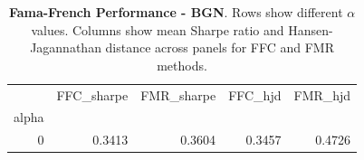 \begin{table}[h]
\centering
\begin{tabular}{rrrrr}
\toprule
 & FFC_sharpe & FMR_sharpe & FFC_hjd & FMR_hjd \\
alpha &  &  &  &  \\
\midrule
0 & 0.3413 & 0.3604 & 0.3457 & 0.4726 \\
\bottomrule
\end{tabular}
\caption{\textbf{Fama-French Performance - BGN}.
    Rows show different $\alpha$ values. Columns show mean Sharpe ratio and
    Hansen-Jagannathan distance across panels for FFC and FMR methods.}
\label{tab:fama_bgn}

\end{table}